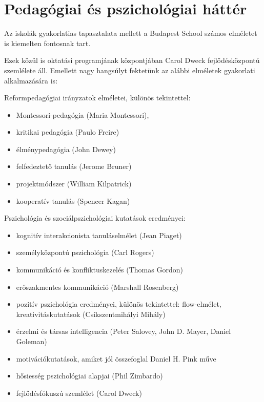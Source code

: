 \section{Pedagógiai és pszichológiai háttér}

Az iskolák gyakorlatias tapasztalata mellett a Budapest School számos elméletet is kiemelten fontosnak tart. 

Ezek közül is oktatási programjának központjában Carol Dweck fejlődésközpontú szemlélete \citep{growthmindset} áll. Emellett nagy hangsúlyt fektetünk az alábbi elméletek gyakorlati alkalmazására is:

Reformpedagógiai irányzatok elméletei, különös tekintettel:

\begin{itemize}

      \item
            Montessori-pedagógia (Maria Montessori),
      \item
            kritikai pedagógia (Paulo Freire)
      \item
            élménypedagógia (John Dewey)
      \item
            felfedeztető tanulás (Jerome Bruner)
      \item
            projektmódszer (William Kilpatrick)
      \item
            kooperatív tanulás (Spencer Kagan)
\end{itemize}

Pszichológia és szociálpszichológiai kutatások eredményei:

\begin{itemize}

      \item
            kognitív interakcionista tanuláselmélet (Jean Piaget)
      \item
            személyközpontú pszichológia (Carl Rogers)
      \item
            kommunikáció és konfliktuskezelés (Thomas Gordon)
      \item
            erőszakmentes kommunikáció (Marshall Rosenberg)
      \item
            pozitív pszichológia eredményei, különös tekintettel: flow-elmélet, kreativitáskutatások (Csík\-szent\-mihályi Mihály)
      \item
            érzelmi és társas intelligencia (Peter Salovey, John D. Mayer, Daniel Goleman)
      \item motivációkutatások, amiket jól összefoglal Daniel H. Pink
        műve\linebreak
        \citep{pink2011drive}
      \item
            hősiesség pszichológiai alapjai (Phil Zimbardo)
      \item
            fejlődésfókuszú szemlélet (Carol Dweck)
\end{itemize}
